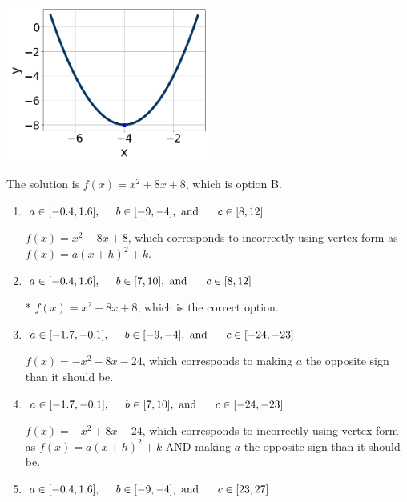 \documentclass{extbook}[14pt]
\begin{document}
\begin{enumerate}
{\begin{center}
    \includegraphics[width=0.5\textwidth]{../Figures/quadraticGraphToEquationCopyA.png}
\end{center}


The solution is \( f(x) = x^{2} +8 x + 8 \), which is option B.\begin{enumerate}[label=\Alph*.]
\item \( a \in [-0.4, 1.6], \hspace*{5mm} b \in [-9, -4], \text{ and } \hspace*{5mm} c \in [8, 12] \)

$f(x)=x^{2} -8 x + 8$, which corresponds to incorrectly using vertex form as $f(x) = a(x+h)^2+k$.
\item \( a \in [-0.4, 1.6], \hspace*{5mm} b \in [7, 10], \text{ and } \hspace*{5mm} c \in [8, 12] \)

* $f(x)=x^{2} +8 x + 8$, which is the correct option.
\item \( a \in [-1.7, -0.1], \hspace*{5mm} b \in [-9, -4], \text{ and } \hspace*{5mm} c \in [-24, -23] \)

$f(x)=-x^{2} -8 x -24$, which corresponds to making $a$ the opposite sign than it should be.
\item \( a \in [-1.7, -0.1], \hspace*{5mm} b \in [7, 10], \text{ and } \hspace*{5mm} c \in [-24, -23] \)

$f(x)=-x^{2} +8 x -24$, which corresponds to incorrectly using vertex form as $f(x) = a(x+h)^2+k$ AND making $a$ the opposite sign than it should be.
\item \( a \in [-0.4, 1.6], \hspace*{5mm} b \in [-9, -4], \text{ and } \hspace*{5mm} c \in [23, 27] \)


\end{enumerate}}
\end{enumerate}
\end{document}
